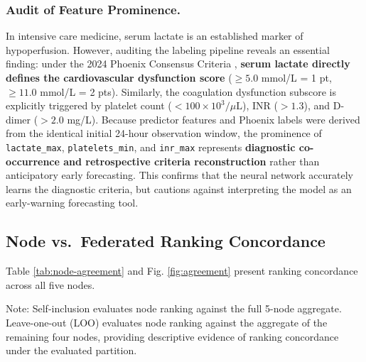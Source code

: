 \documentclass[runningheads]{llncs}
\begin{document}
\subsubsection{Audit of Feature Prominence.}
In intensive care medicine, serum lactate is an established marker of hypoperfusion. However, auditing the labeling pipeline reveals an essential finding: under the 2024 Phoenix Consensus Criteria \cite{schlapbach2024phoenix,sanchezpinto2024phoenix}, \textbf{serum lactate directly defines the cardiovascular dysfunction score} ($\ge 5.0$ mmol/L = 1 pt, $\ge 11.0$ mmol/L = 2 pts). Similarly, the coagulation dysfunction subscore is explicitly triggered by platelet count ($<100 \times 10^3/\mu\text{L}$), INR ($>1.3$), and D-dimer ($>2.0$ mg/L). Because predictor features and Phoenix labels were derived from the identical initial 24-hour observation window, the prominence of \texttt{lactate\_max}, \texttt{platelets\_min}, and \texttt{inr\_max} represents \textbf{diagnostic co-occurrence and retrospective criteria reconstruction} rather than anticipatory early forecasting. This confirms that the neural network accurately learns the diagnostic criteria, but cautions against interpreting the model as an early-warning forecasting tool.

\subsection{Node vs.\ Federated Ranking Concordance}
Table \ref{tab:node-agreement} and Fig. \ref{fig:agreement} present ranking concordance across all five nodes.

\begin{table}[t]
\caption{Spearman rank correlation ($\rho$): node ranking vs.\ federated aggregate}
\label{tab:node-agreement}
\centering
\small
{}
\vspace{1mm}
\raggedright \scriptsize Note: Self-inclusion evaluates node ranking against the full 5-node aggregate. Leave-one-out (LOO) evaluates node ranking against the aggregate of the remaining four nodes, providing descriptive evidence of ranking concordance under the evaluated partition.
\end{table}
\end{document}
